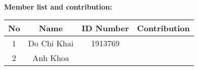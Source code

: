 \documentclass[10pt]{article}
\newcommand\tab[1][1cm]{\hspace*{#1}}
\begin{document}
\renewcommand{\baselinestretch}{1.25}\normalsize
\large{\\
\textbf{\Large{Member list and contribution:}}\\
\hspace{3cm}
\begin{center}
\begin{tabular}{|c|c|c|c|}
\hline
\textbf{No} & \textbf{Name} & \textbf{ID Number} & \textbf{Contribution}\\
\hline 
{1} & {Do Chi Khai} & {1913769} & {}\\

\hline
{2} & {Anh Khoa} & {} & {}\\
\hline
\end{tabular}
\end{center}
}
\newpage


\newpage
\renewcommand{\baselinestretch}{1.50}\Large
\tableofcontents
\newpage

\large
\end{document}
